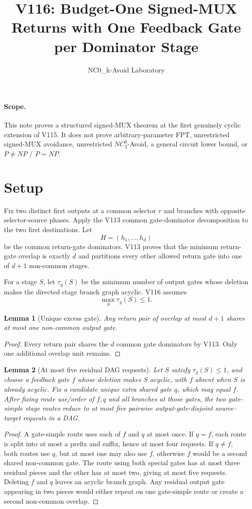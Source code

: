 \documentclass[11pt]{article}
\title{V116: Budget-One Signed-MUX Returns with One Feedback Gate per Dominator Stage}
\author{NC0\_k-Avoid Laboratory}
\date{}
\newtheorem{lemma}{Lemma}
\begin{document}
\maketitle

\paragraph{Scope.}
This note proves a structured signed-MUX theorem at the first genuinely cyclic extension of V115. It does not prove arbitrary-parameter FPT, unrestricted signed-MUX avoidance, unrestricted $NC^0_3$-Avoid, a general circuit lower bound, or $P\neq NP$ / $P=NP$.

\section{Setup}
Fix two distinct first outputs at a common selector $r$ and branches with opposite selector-source phases. Apply the V113 common gate-dominator decomposition to the two first destinations. Let
\[
H=(h_1,\ldots,h_d)
\]
be the common return-gate dominators. V113 proves that the minimum return-gate overlap is exactly $d$ and partitions every other allowed return gate into one of $d+1$ non-common stages.

For a stage $S$, let $\tau_g(S)$ be the minimum number of output gates whose deletion makes the directed stage branch graph acyclic. V116 assumes
\[
\max_S \tau_g(S)\leq 1.
\]

\begin{lemma}[Unique excess gate]
Any return pair of overlap at most $d+1$ shares at most one non-common output gate.
\end{lemma}
\begin{proof}
Every return pair shares the $d$ common gate dominators by V113. Only one additional overlap unit remains.
\end{proof}

\begin{lemma}[At most five residual DAG requests]
Let $S$ satisfy $\tau_g(S)\leq1$, and choose a feedback gate $f$ whose deletion makes $S$ acyclic, with $f$ absent when $S$ is already acyclic. Fix a candidate unique extra shared gate $q$, which may equal $f$. After fixing route use/order of $f,q$ and all branches at those gates, the two gate-simple stage routes reduce to at most five pairwise output-gate-disjoint source--target requests in a DAG.
\end{lemma}
\begin{proof}
A gate-simple route uses each of $f$ and $q$ at most once. If $q=f$, each route is split into at most a prefix and suffix, hence at most four requests. If $q\neq f$, both routes use $q$, but at most one may also use $f$, otherwise $f$ would be a second shared non-common gate. The route using both special gates has at most three residual pieces and the other has at most two, giving at most five requests. Deleting $f$ and $q$ leaves an acyclic branch graph. Any residual output gate appearing in two pieces would either repeat on one gate-simple route or create a second non-common overlap.
\end{proof}
\end{document}
